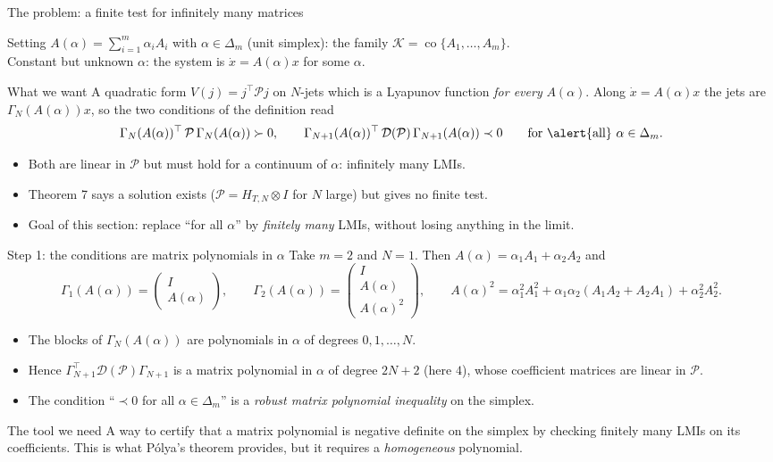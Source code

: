 \documentclass[10pt,aspectratio=169]{beamer}
\newcommand{\tr}{^{\top}}
\newcommand{\PP}{\mathcal{P}}
\newcommand{\DD}{\mathcal{D}}
\newcommand{\KK}{\mathcal{K}}
\DeclareMathOperator{\co}{co}
\begin{document}
\begin{frame}{The problem: a finite test for infinitely many matrices}
\begin{block}{Setting}
$A(\alpha)=\sum_{i=1}^m\alpha_iA_i$ with $\alpha\in\Delta_m$ (unit simplex): the family $\KK=\co\{A_1,\dots,A_m\}$. \\
Constant but unknown $\alpha$: the system is $\dot x=A(\alpha)x$ for some $\alpha$.
\end{block}
\begin{block}{What we want}
A quadratic form $V(j)=j\tr\PP j$ on $N$-jets which is a Lyapunov function \emph{for every} $A(\alpha)$. Along $\dot x=A(\alpha)x$ the jets are $\Gamma_N(A(\alpha))x$, so the two conditions of the definition read
\[
\Gamma_N(A(\alpha))\tr\,\PP\,\Gamma_N(A(\alpha))\succ0,\qquad
\Gamma_{N+1}(A(\alpha))\tr\,\DD(\PP)\,\Gamma_{N+1}(A(\alpha))\prec0\qquad\text{for \alert{all} }\alpha\in\Delta_m .
\]
\end{block}
\begin{itemize}
\item Both are linear in $\PP$ but must hold for a \alert{continuum} of $\alpha$: infinitely many LMIs.
\item Theorem 7 says a solution exists ($\PP=H_{T,N}\otimes I$ for $N$ large) but gives no finite test.
\item Goal of this section: replace ``for all $\alpha$'' by \emph{finitely many} LMIs, without losing anything in the limit.
\end{itemize}
\end{frame}

\begin{frame}{Step 1: the conditions are matrix polynomials in $\alpha$}
Take $m=2$ and $N=1$. Then $A(\alpha)=\alpha_1A_1+\alpha_2A_2$ and
\[
\Gamma_1(A(\alpha))=\begin{pmatrix}I\\A(\alpha)\end{pmatrix},\qquad
\Gamma_2(A(\alpha))=\begin{pmatrix}I\\A(\alpha)\\A(\alpha)^2\end{pmatrix},\qquad
A(\alpha)^2=\alpha_1^2A_1^2+\alpha_1\alpha_2(A_1A_2+A_2A_1)+\alpha_2^2A_2^2 .
\]
\begin{itemize}
\item The blocks of $\Gamma_{N}(A(\alpha))$ are polynomials in $\alpha$ of degrees $0,1,\dots,N$.
\item Hence $\Gamma_{N+1}\tr\DD(\PP)\Gamma_{N+1}$ is a \alert{matrix polynomial} in $\alpha$ of degree $2N+2$ (here $4$), whose coefficient matrices are linear in $\PP$.
\item The condition ``$\prec0$ for all $\alpha\in\Delta_m$'' is a \emph{robust matrix polynomial inequality} on the simplex.
\end{itemize}
\begin{block}{The tool we need}
A way to certify that a matrix polynomial is negative definite on the simplex by checking finitely many LMIs on its coefficients. This is what P\'olya's theorem provides, but it requires a \emph{homogeneous} polynomial.
\end{block}
\end{frame}
\end{document}
